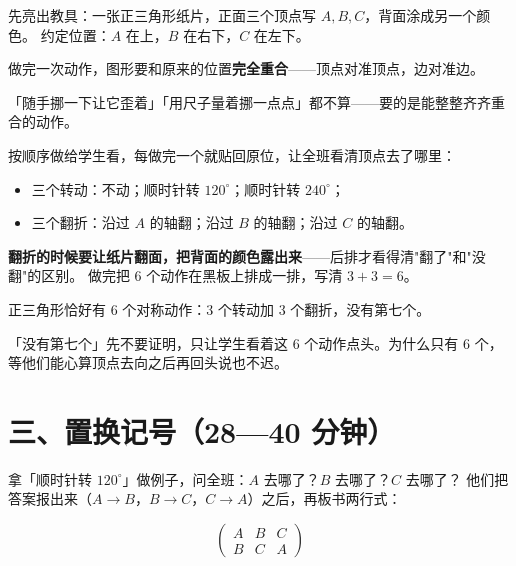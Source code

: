 先亮出教具：一张正三角形纸片，正面三个顶点写 \(A,B,C\)，背面涂成另一个颜色。
约定位置：\(A\) 在上，\(B\) 在右下，\(C\) 在左下。

\begin{definition}[对称动作]
  做完一次动作，图形要和原来的位置\textbf{完全重合}——顶点对准顶点，边对准边。
\end{definition}

\begin{zhu}
  「随手挪一下让它歪着」「用尺子量着挪一点点」都不算——要的是能整整齐齐重合的动作。
\end{zhu}

\begin{caozuo}
  按顺序做给学生看，每做完一个就贴回原位，让全班看清顶点去了哪里：
  \begin{itemize}
    \item 三个转动：不动；顺时针转 \(120^\circ\)；顺时针转 \(240^\circ\)；
    \item 三个翻折：沿过 \(A\) 的轴翻；沿过 \(B\) 的轴翻；沿过 \(C\) 的轴翻。
  \end{itemize}
  \textbf{翻折的时候要让纸片翻面，把背面的颜色露出来}——后排才看得清"翻了"和"没翻"的区别。
  做完把 \(6\) 个动作在黑板上排成一排，写清 \(3+3=6\)。
\end{caozuo}

\begin{dingli}[正三角形的对称动作]
  正三角形恰好有 \(6\) 个对称动作：\(3\) 个转动加 \(3\) 个翻折，没有第七个。
\end{dingli}

\begin{zhu}
  「没有第七个」先不要证明，只让学生看着这 \(6\) 个动作点头。为什么只有 \(6\) 个，
  等他们能心算顶点去向之后再回头说也不迟。
\end{zhu}

\section*{三、置换记号（28—40 分钟）}

\begin{caozuo}
  拿「顺时针转 \(120^\circ\)」做例子，问全班：\(A\) 去哪了？\(B\) 去哪了？\(C\) 去哪了？
  他们把答案报出来（\(A\to B\)，\(B\to C\)，\(C\to A\)）之后，再板书两行式：
\end{caozuo}

\[
  \begin{pmatrix}
    A & B & C\\
    B & C & A
  \end{pmatrix}
\]

